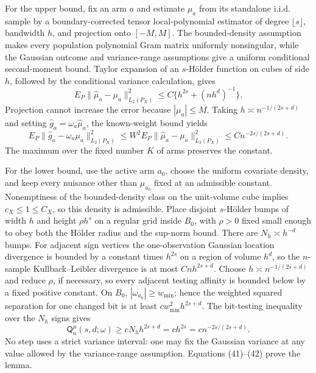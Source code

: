 For the upper bound, fix an arm \(a\) and estimate \(\mu_a\) from its standalone i.i.d. sample by a boundary-corrected tensor local-polynomial estimator of degree \(\lfloor s\rfloor\), bandwidth \(h\), and projection onto \([-M,M]\). The bounded-density assumption makes every population polynomial Gram matrix uniformly nonsingular, while the Gaussian outcome and variance-range assumptions give a uniform conditional second-moment bound. Taylor expansion of an \(s\)-Hölder function on cubes of side \(h\), followed by the conditional variance calculation, gives
\[
E_P\|\widehat\mu_a-\mu_a\|_{L_2(P_X)}^2
\leq C\{h^{2s}+(nh^d)^{-1}\}.
\tag{40}
\]
Projection cannot increase the error because \(|\mu_a|\leq M\). Taking \(h\asymp n^{-1/(2s+d)}\) and setting \(\widehat g_a=\omega_a\widehat\mu_a\), the known-weight bound yields
\[
E_P\|\widehat g_a-\omega_a\mu_a\|_{L_2(P_X)}^2
\leq W^2 E_P\|\widehat\mu_a-\mu_a\|_{L_2(P_X)}^2
\leq C n^{-2s/(2s+d)}.
\tag{41}
\]
The maximum over the fixed number \(K\) of arms preserves the constant.

For the lower bound, use the active arm \(a_0\), choose the uniform covariate density, and keep every nuisance other than \(\mu_{a_0}\) fixed at an admissible constant. Nonemptiness of the bounded-density class on the unit-volume cube implies \(c_X\leq1\leq C_X\), so this density is admissible. Place disjoint \(s\)-Hölder bumps of width \(h\) and height \(\rho h^s\) on a regular grid inside \(B_0\), with \(\rho>0\) fixed small enough to obey both the Hölder radius and the sup-norm bound. There are \(N_h\asymp h^{-d}\) bumps. For adjacent sign vertices the one-observation Gaussian location divergence is bounded by a constant times \(h^{2s}\) on a region of volume \(h^d\), so the \(n\)-sample Kullback--Leibler divergence is at most \(Cnh^{2s+d}\). Choose \(h\asymp n^{-1/(2s+d)}\) and reduce \(\rho\), if necessary, so every adjacent testing affinity is bounded below by a fixed positive constant. On \(B_0\), \(|\omega_{a_0}|\geq w_{\min}\); hence the weighted squared separation for one changed bit is at least \(c w_{\min}^2h^{2s+d}\). The bit-testing inequality over the \(N_h\) signs gives
\[
\mathsf Q_n^{\mu}(s,d;\omega)
\geq cN_hh^{2s+d}
=c h^{2s}
=c n^{-2s/(2s+d)}.
\tag{42}
\]
No step uses a strict variance interval: one may fix the Gaussian variance at any value allowed by the variance-range assumption. Equations (41)--(42) prove the lemma.